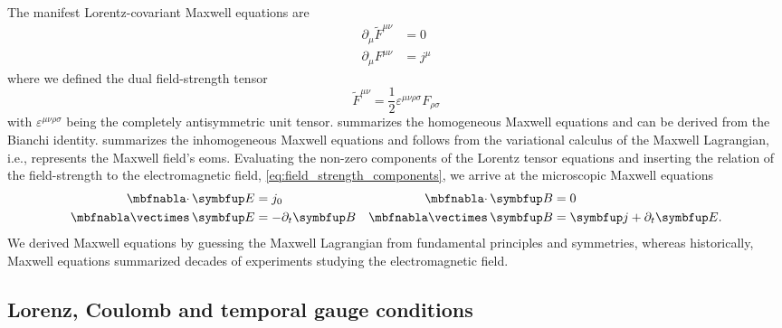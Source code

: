 The manifest Lorentz-covariant Maxwell equations are~\cite[p.~336]{Srednicki2007}
\begin{align}
	\partial_\mu
	\tilde{F}^{\mu\nu}
	&=
	0
	\label{eq:covariant_homogeneous_maxwell_equations}
	\\
	\partial_\mu
	F^{\mu\nu}
	&=
	j^\mu
	\label{eq:covariant_inhomogeneous_maxwell_equations}
\end{align}
where we defined the dual field-strength tensor~\cite[p.~142]{Greiner2013}
\begin{equation}
	\tilde{F}^{\mu\nu}
	=
	\frac{1}{2}
	\varepsilon^{\mu\nu\rho\sigma}
	F_{\rho\sigma}
	\label{eq:dual_field_strength}
\end{equation}
with $\varepsilon^{\mu\nu\rho\sigma}$ being the completely antisymmetric unit tensor.
 summarizes the homogeneous Maxwell equations and can be derived from the Bianchi identity.
 summarizes the inhomogeneous Maxwell equations and follows from the variational calculus of the Maxwell Lagrangian, i.e., represents the Maxwell field's \gls{eom}s.
Evaluating the non-zero components of the Lorentz tensor equations and inserting the relation of the field-strength to the electromagnetic field, \cref{eq:field_strength_components}, we arrive at the microscopic Maxwell equations
\begin{align}
	\div\vb{E}
	&=
	j_0
	&
	\div\vb{B}
	&=
	0
	\\
	\curl\vb{E}
	&=
	-\partial_t\vb{B}
	&
	\curl\vb{B}
	&=
	\vb{j}
	+
	\partial_t\vb{E}
	.
\end{align}
We derived Maxwell equations by guessing the Maxwell Lagrangian from fundamental principles and symmetries, whereas historically, Maxwell equations summarized decades of experiments studying the electromagnetic field.

\subsection{Lorenz, Coulomb and temporal gauge conditions}

